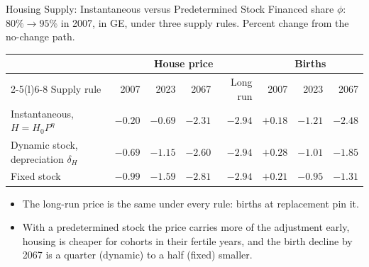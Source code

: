 \begin{frame}[t]{Housing Supply: Instantaneous versus Predetermined Stock}
\linespread{1.0}\footnotesize\selectfont
Financed share $\phi$: $80\%\to95\%$ in 2007, in GE, under three supply rules. Percent change from the no-change path.
\smallskip

\scriptsize\setlength{\tabcolsep}{4pt}\renewcommand{\arraystretch}{1.05}
\begin{tabularx}{\textwidth}{@{}Xrrrrrrr@{}}
\toprule
 & \multicolumn{4}{c}{House price} & \multicolumn{3}{c}{Births} \\
\cmidrule(lr){2-5}\cmidrule(l){6-8}
Supply rule & 2007 & 2023 & 2067 & Long run & 2007 & 2023 & 2067 \\
\midrule
Instantaneous, $H=H_0P^{\eta}$ & $-0.20$ & $-0.69$ & $-2.31$ & $-2.94$ & $+0.18$ & $-1.21$ & $-2.48$ \\
Dynamic stock, depreciation $\delta_H$ & $-0.69$ & $-1.15$ & $-2.60$ & $-2.94$ & $+0.28$ & $-1.01$ & $-1.85$ \\
Fixed stock & $-0.99$ & $-1.59$ & $-2.81$ & $-2.94$ & $+0.21$ & $-0.95$ & $-1.31$ \\
\bottomrule
\end{tabularx}
\smallskip

\footnotesize
\begin{itemize}\setlength\itemsep{1pt}\setlength\topsep{2pt}
\item The long-run price is the same under every rule: births at replacement pin it.
\item With a predetermined stock the price carries more of the adjustment early, housing is cheaper for cohorts in their fertile years,
and the birth decline by 2067 is a quarter (dynamic) to a half (fixed) smaller.
\end{itemize}

\end{frame}

